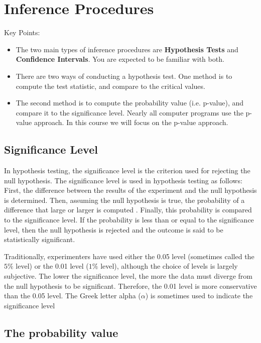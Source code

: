 \documentclass[a4paper,12pt]{article}
\begin{document}
\tableofcontents
\newpage

\section{Inference Procedures}
Key Points:
\begin{itemize}
\item The two main types of inference procedures are \textbf{Hypothesis Tests} and \textbf{Confidence Intervals}. You are expected to be familiar with both.

\item There are two ways of conducting a hypothesis test. One method is to compute the test statistic, and compare to the critical values.

\item The second method is to compute the probability value  (i.e. p-value), and compare it to the significance level. Nearly all computer programs use the p-value approach. In this course we will focus on the p-value approach.
\end{itemize}

\subsection{Significance Level}

In hypothesis testing, the significance level is the criterion used for rejecting the null hypothesis. The significance level is used in hypothesis testing as follows: First, the difference between the results of the experiment and the null hypothesis is determined. Then, assuming the null hypothesis is true, the probability of a difference that large or larger is computed . Finally, this probability is compared to the significance level. If the probability is less than or equal to the significance level, then the null hypothesis is rejected and the outcome is said to be statistically significant.

Traditionally, experimenters have used either the 0.05 level (sometimes called the $5\%$ level) or the 0.01 level ($1\%$ level), although the choice of levels is largely subjective. The lower the significance level, the more the data must diverge from the null hypothesis to be significant.
 Therefore, the 0.01 level is more conservative than the 0.05 level. The Greek letter alpha ($\alpha$) is sometimes used to indicate the significance level

\subsection{The probability value }
\end{document}
